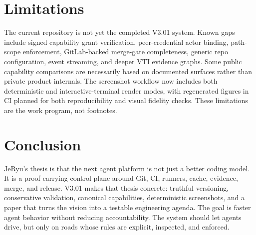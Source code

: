 \documentclass[conference]{IEEEtran}
\begin{document}
\section{Limitations}
The current repository is not yet the completed V3.01 system. Known gaps include signed capability grant verification, peer-credential actor binding, path-scope enforcement, GitLab-backed merge-gate completeness, generic repo configuration, event streaming, and deeper VTI evidence graphs. Some public capability comparisons are necessarily based on documented surfaces rather than private product internals. The screenshot workflow now includes both deterministic and interactive-terminal render modes, with regenerated figures in CI planned for both reproducibility and visual fidelity checks. These limitations are the work program, not footnotes.

\section{Conclusion}
JeRyu's thesis is that the next agent platform is not just a better coding model. It is a proof-carrying control plane around Git, CI, runners, cache, evidence, merge, and release. V3.01 makes that thesis concrete: truthful versioning, conservative validation, canonical capabilities, deterministic screenshots, and a paper that turns the vision into a testable engineering agenda. The goal is faster agent behavior without reducing accountability. The system should let agents drive, but only on roads whose rules are explicit, inspected, and enforced.

\appendices





\end{document}
